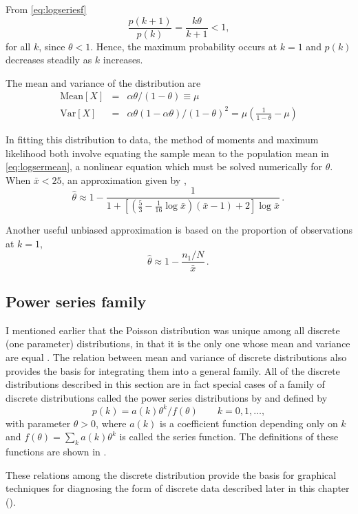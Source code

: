 From \eqref{eq:logseriesf}
\begin{equation*}
\frac{p(k+1)}{p(k)} = \frac{k \theta}{k+1} < 1
\comma
\end{equation*}
for all $k$, since $\theta < 1$.  Hence, the maximum probability occurs at $k=1$
and $p(k)$ decreases steadily as $k$ increases.

The mean and variance of the distribution are
\begin{eqnarray}
\textrm{Mean}[X] & = & \alpha \theta / (1-\theta ) \equiv \mu \label{eq:logsermean}\\
\textrm{Var}[X] & = &  \alpha \theta (1-\alpha\theta) / (1-\theta )^2
= \mu ( \frac{1}{1-\theta} - \mu )
\nonumber
\end{eqnarray}

In fitting this distribution to data, the method of moments and maximum likelihood
both involve equating the sample mean to the population mean in \eqref{eq:logsermean},
a nonlinear equation which must be solved numerically for $\theta$.
When $\bar{x} < 25$, an approximation given by
\citet{Birch:63},
\begin{equation*}%
\hat\theta  \approx
1 - \frac{1}{1 + [ ( \frac{5}{3} - \frac{1}{16}\log \bar{x}) (\bar{x}-1) + 2 ] \log \bar{x} }
\period
\end{equation*}

Another useful unbiased approximation is based on the proportion of observations
at $k=1$,
\begin{equation*}
\hat\theta  \approx 1- \frac{n_1 / N}{\bar{x}}
\period
\end{equation*}

\subsection{Power series family}\label{sec:pwrseries}

I mentioned earlier that the Poisson distribution was unique among all discrete (one parameter) distributions, in that it is the only one whose mean and variance are equal
\citep{Kosambi:49}.
The relation between mean and variance of discrete distributions also provides
the basis for integrating them into a general family.
All of the discrete distributions described in this section are in fact
special cases of a family of discrete distributions
called the power series distributions by
\citet{Noack:50}
and defined by
\begin{equation*}
p(k) = a(k) \theta^k / f(\theta)
\quad\quad k=0, 1, \dots \comma
\end{equation*}
with parameter $\theta > 0$,
where $a(k)$ is a coefficient function depending only on $k$
and $f ( \theta) = \sum_k a(k) \theta^k$ is called the series
function.  The definitions of these functions are shown in
.


These relations among the discrete distribution provide the basis for
graphical techniques for diagnosing the form of discrete data described
later in this chapter ().
